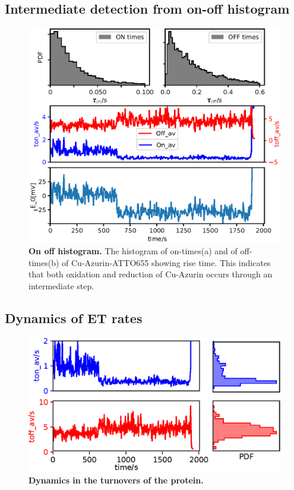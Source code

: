 \documentclass[journal=jacsat,manuscript=article]{achemso}
\begin{document}
\subsection{Intermediate detection from on-off histogram}
\begin{figure}
	\includegraphics[width=\textwidth]{Figure/Figure_3_on_off_1D.eps}
	\caption{\textbf{On off histogram.} The histogram of on-times(a) and of off-times(b) of Cu-Azurin-ATTO655 showing rise time. This indicates that both oxidation and reduction of Cu-Azurin occurs through an intermediate step.}
	\label{fig:onoff1D}
\end{figure}
\subsection{Dynamics of ET rates}
\begin{figure}
	\includegraphics[width=\textwidth]{dynamic_rates.eps}
	\caption{\textbf{Dynamics in the turnovers of the protein.}}
	\label{fig:dynamic_rates}
\end{figure}
\end{document}
